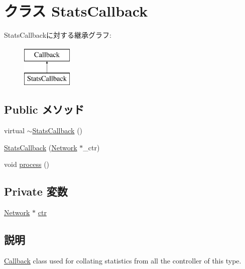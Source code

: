 \hypertarget{classNetwork_1_1StatsCallback}{
\section{クラス StatsCallback}
\label{classNetwork_1_1StatsCallback}
}
StatsCallbackに対する継承グラフ:\begin{figure}[H]
\begin{center}
\leavevmode
\includegraphics[height=2cm]{classNetwork_1_1StatsCallback}
\end{center}
\end{figure}
\subsection*{Public メソッド}
\begin{DoxyCompactItemize}
\item 
virtual \hyperlink{classNetwork_1_1StatsCallback_af912e043410ed023ceb7b6eacf42a794}{$\sim$StatsCallback} ()
\item 
\hyperlink{classNetwork_1_1StatsCallback_a954f1218381a4e8c333dc55cecebff73}{StatsCallback} (\hyperlink{classNetwork}{Network} $\ast$\_\-ctr)
\item 
void \hyperlink{classNetwork_1_1StatsCallback_a2e9c5136d19b1a95fc427e0852deab5c}{process} ()
\end{DoxyCompactItemize}
\subsection*{Private 変数}
\begin{DoxyCompactItemize}
\item 
\hyperlink{classNetwork}{Network} $\ast$ \hyperlink{classNetwork_1_1StatsCallback_a78229efdbb514c8c35d14a0457feca02}{ctr}
\end{DoxyCompactItemize}


\subsection{説明}
\hyperlink{classCallback}{Callback} class used for collating statistics from all the controller of this type. 

